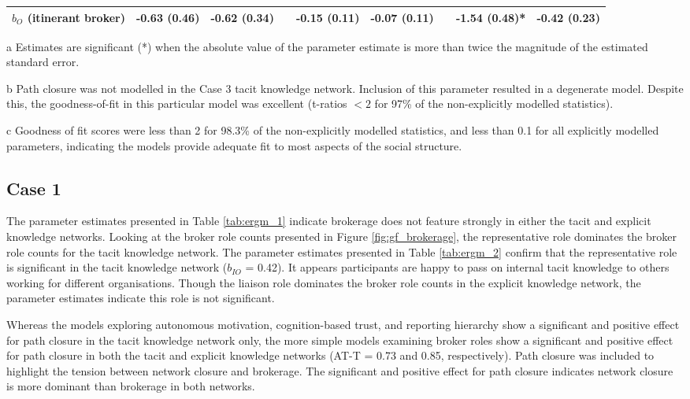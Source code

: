 \begin{sidewaystable}[p]
{\begin{threeparttable}
\begin{tabular}{@{}lrrlrrlrr@{}}
$b_O$ (itinerant broker) & -0.63 (0.46)\phantom{*} & -0.62 (0.34)\phantom{*} &  & -0.15 (0.11)\phantom{*} & -0.07 (0.11)\phantom{*} &  & -1.54 (0.48)* & -0.42 (0.23)\phantom{*} \\
 \bottomrule
\end{tabular}
\begin{tablenotes}
\footnotesize
\item[a] Estimates are significant (*) when the absolute value of the parameter estimate is more than twice the magnitude of the estimated standard error.
\item[b] Path closure was not modelled in the Case 3 tacit knowledge network. Inclusion of this parameter resulted in a degenerate model. Despite this, the goodness-of-fit in this particular model was excellent (t-ratios $<2$ for 97\% of the non-explicitly modelled statistics).
\item[c] Goodness of fit scores were less than 2 for 98.3\% of the non-explicitly modelled statistics, and less than 0.1 for all explicitly modelled parameters, indicating the models provide adequate fit to most aspects of the social structure.

\end{tablenotes}

\end{threeparttable}
%
}
\end{sidewaystable}

\subsection{Case 1}

The parameter estimates presented in Table \ref{tab:ergm_1} indicate brokerage does not feature strongly in either the tacit and explicit knowledge networks.  Looking at the broker role counts presented in Figure \ref{fig:gf_brokerage}, the representative role dominates the broker role counts for the tacit knowledge network. The parameter estimates presented in Table \ref{tab:ergm_2} confirm that the representative role is significant in the tacit knowledge network ($b_{IO}$ = 0.42). It appears participants are happy to pass on internal tacit knowledge to others working for different organisations. Though the liaison role dominates the broker role counts in the explicit knowledge network, the parameter estimates indicate this role is not significant. \medskip

Whereas the models exploring autonomous motivation, cognition-based trust, and reporting hierarchy show a significant and positive effect for path closure in the tacit knowledge network only, the more simple models examining broker roles show a significant and positive effect for path closure in both the tacit and explicit knowledge networks (AT-T = 0.73 and 0.85, respectively). Path closure was included to highlight the tension between network closure and brokerage. The significant and positive effect for path closure indicates network closure is more dominant than brokerage in both networks. 


